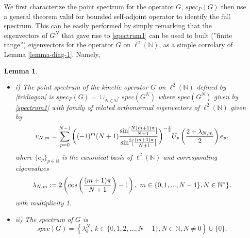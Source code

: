 \documentclass[a4paper,11pt,twoside]{article}
\numberwithin{equation}{section}
\newtheorem{lemma}[Theorem]{Lemma}
\theoremstyle{nonumberplain}
\begin{document}
We first characterize the point spectrum for the operator $G$, $spec_P(G)$ then use a general theorem valid for bounded self-adjoint operator to identify the full spectrum. This can be easily performed by simply remarking that the eigenvectors of $G^N$ that gave rise to \eqref{spectrum1} can be used to built (''finite range'') eigenvectors for the operator $G$ on $\ell^2(\mathbb{N})$, as a simple corrolary of Lemma \ref{lemma-diag-1}. Namely, 
\begin{lemma}\label{lemma-spectrum-full} \ \\[-20pt]
\begin{itemize}
\setlength{\itemsep}{-1pt}
\item i) The point spectrum of the kinetic operator $G$ on $\ell^2(\mathbb{N})$ defined by \eqref{tridiagon} is $spec_P(G)=\cup_{N\in\mathbb{N}^*}spec(G^N)$ where $spec(G^N)$ given by \eqref{spectrum1} with family of related orthonormal eigenvectors of $\ell^2(\mathbb{N})$ given by 
\begin{equation}
v_{N,m}=\sum_{p=0}^{N-1}\bigg((-1)^m(N+1){{ \sin[{{N(m+1)\pi }\over{N+1 }}  ]}\over {\sin^3[{{(m+1)\pi }\over{N+1 }} ] }} \bigg)^{-{{1}\over{2}}}  U_p\left({{2+\lambda_{N,m}}\over{2}}\right)e_p\label{eigenvektor},
\end{equation}
where $\{e_p\}_{p\in\mathbb{N}}$ is the canonical basis of $\ell^2(\mathbb{N})$ and corresponding eigenvalues
\begin{equation}
\lambda_{N,m}:=2\left(\cos\left({{(m+1)\pi}\over{N+1}}\right)-1\right), \ m\in\{0,1,...,N-1\}, N\in\mathbb{N}^*\}.
\end{equation}
with multiplicity 1.
\item ii) The spectrum of $G$ is 
\begin{equation}
spec(G)=\left\{\lambda^N_k,\ k\in\{0,1,2,...,N-1\}, N\in\mathbb{N}, N\ne0 \right\}\cup\{0\}\label{spectrum-full}.
\end{equation}
\end{itemize}
\end{lemma}
\end{document}
